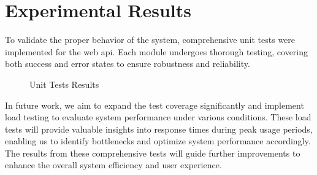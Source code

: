 \chapter{Experimental Results}
\label{cap:experimental_results}

To validate the proper behavior of the system, comprehensive unit tests were implemented for the web \ac{api}. Each module undergoes thorough testing, covering both success and error states to ensure robustness and reliability.

\begin{figure}[H]
\centering
{}
\caption{Unit Tests Results}
\label{fig:unit_tests}
\end{figure}

In future work, we aim to expand the test coverage significantly and implement load testing to evaluate system performance under various conditions. These load tests will provide valuable insights into response times during peak usage periods, enabling us to identify bottlenecks and optimize system performance accordingly. The results from these comprehensive tests will guide further improvements to enhance the overall system efficiency and user experience.